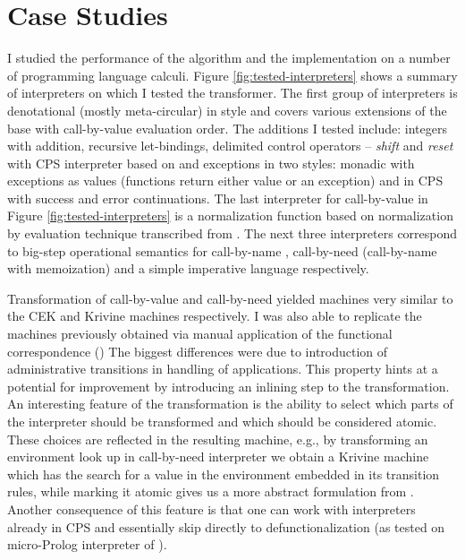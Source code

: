 \chapter{Case Studies}\label{chapter:case-studies}
I studied the performance of the algorithm and the implementation on a number of programming language calculi.
Figure \ref{fig:tested-interpreters} shows a summary of interpreters on which I tested the transformer.
The first group of interpreters is denotational (mostly meta-circular) in style and covers various extensions of the base \LC{} with call-by-value evaluation order.
The additions I tested include: integers with addition, recursive let-bindings, delimited control operators -- \textit{shift} and \textit{reset} with CPS interpreter based on \cite{biernacka-delimited-continuations} and exceptions in two styles: monadic with exceptions as values (functions return either value or an exception) and in CPS with success and error continuations.
The last interpreter for call-by-value in Figure \ref{fig:tested-interpreters} is a normalization function based on normalization by evaluation technique transcribed from \cite{abel-nbe}.
The next three interpreters correspond to big-step operational semantics for call-by-name \LC{}, call-by-need (call-by-name with memoization) and a simple imperative language respectively.

Transformation of call-by-value and call-by-need \LC{} yielded machines very similar to the CEK and Krivine machines respectively.
I was also able to replicate the machines previously obtained via manual application of the functional correspondence (\cite{functional-correspondence,biernacka-delimited-continuations,biernacki-logic-engine})
The biggest differences were due to introduction of administrative transitions in handling of applications.
This property hints at a potential for improvement by introducing an inlining step to the transformation.
An interesting feature of the transformation is the ability to select which parts of the interpreter should be transformed and which should be considered atomic.
These choices are reflected in the resulting machine, e.g., by transforming an environment look up in call-by-need interpreter we obtain a Krivine machine which has the search for a value in the environment embedded in its transition rules, while marking it atomic gives us a more abstract formulation from \cite{functional-correspondence}.
Another consequence of this feature is that one can work with interpreters already in CPS and essentially skip directly to defunctionalization (as tested on micro-Prolog interpreter of \cite{biernacki-logic-engine}).

